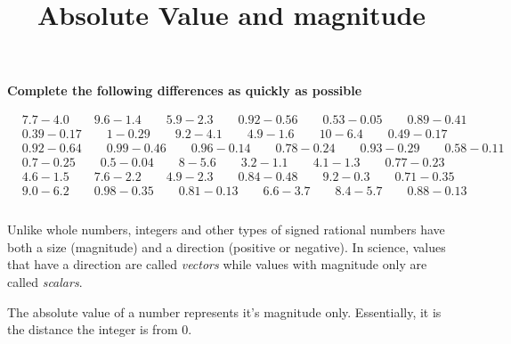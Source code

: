\documentclass{article}
\begin{document}
\textbf{Complete the following differences as quickly as possible}
\bigskip



\bigskip

\(\begin{aligned}
	&7.7-4.0 \qquad  9.6-1.4 \qquad 5.9-2.3  \qquad  0.92-0.56  \qquad 0.53-0.05  \qquad  0.89-0.41  \\[2em]
	&0.39-0.17  \qquad  1-0.29   \qquad   9.2-4.1  \qquad  4.9-1.6  \qquad   10-6.4  \qquad  0.49-0.17 \\[2em]
	&0.92-0.64   \qquad  0.99-0.46    \qquad   0.96-0.14  \qquad 0.78-0.24 \qquad  0.93-0.29 \qquad 0.58-0.11 \\[2em]
	&0.7-0.25    \qquad  0.5-0.04    \qquad 8-5.6 \qquad  3.2-1.1  \qquad  4.1-1.3 \qquad  0.77-0.23  \\[2em]
	&4.6-1.5    \qquad  7.6-2.2    \qquad  4.9-2.3  \qquad 0.84-0.48 \qquad   9.2-0.3  \qquad  0.71-0.35 \\[2em]
	&9.0-6.2   \qquad 0.98-0.35    \qquad    0.81-0.13   \qquad   6.6-3.7   \qquad    8.4-5.7   \qquad 0.88-0.13 \\\\
\end{aligned}\)

\newpage

\begin{center}
	\title{\large{Absolute Value and magnitude}}
\end{center}

Unlike whole numbers, integers and other types of signed rational numbers have both a size (magnitude) and a direction (positive or negative). In science, values that have a direction are called \textit{vectors} while values with magnitude only are called \textit{scalars}.

The absolute value of a number represents it's magnitude only. Essentially, it is the distance the integer is from 0.
\end{document}

